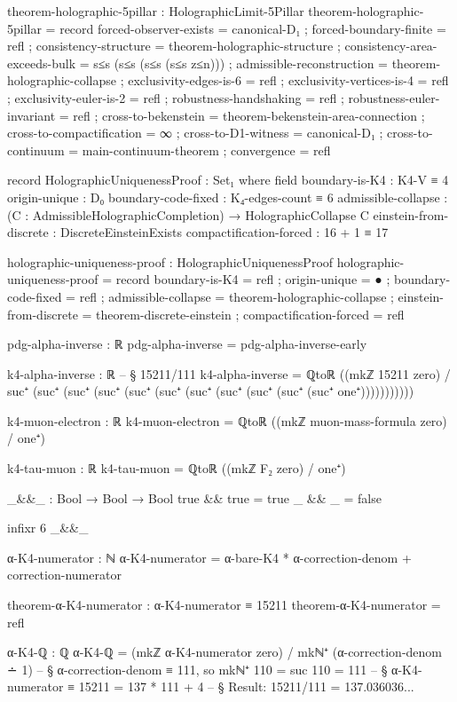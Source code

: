 \documentclass[11pt,a4paper]{book}
\begin{document}
\begin{code}
theorem-holographic-5pillar : HolographicLimit-5Pillar
theorem-holographic-5pillar = record
  { forced-observer-exists        = canonical-D₁
  ; forced-boundary-finite        = refl
  ; consistency-structure         = theorem-holographic-structure
  ; consistency-area-exceeds-bulk = s≤s (s≤s (s≤s (s≤s z≤n)))
  ; admissible-reconstruction     = theorem-holographic-collapse
  ; exclusivity-edges-is-6        = refl
  ; exclusivity-vertices-is-4     = refl
  ; exclusivity-euler-is-2        = refl
  ; robustness-handshaking        = refl
  ; robustness-euler-invariant    = refl
  ; cross-to-bekenstein           = theorem-bekenstein-area-connection
  ; cross-to-compactification     = ∞
  ; cross-to-D1-witness           = canonical-D₁
  ; cross-to-continuum            = main-continuum-theorem
  ; convergence                   = refl
  }

record HolographicUniquenessProof : Set₁ where
  field
    boundary-is-K4 : K4-V ≡ 4
    origin-unique : D₀
    boundary-code-fixed : K₄-edges-count ≡ 6
    admissible-collapse : (C : AdmissibleHolographicCompletion) → HolographicCollapse C
    einstein-from-discrete : DiscreteEinsteinExists
    compactification-forced : 16 + 1 ≡ 17

holographic-uniqueness-proof : HolographicUniquenessProof
holographic-uniqueness-proof = record
  { boundary-is-K4 = refl
  ; origin-unique = ●
  ; boundary-code-fixed = refl
  ; admissible-collapse = theorem-holographic-collapse
  ; einstein-from-discrete = theorem-discrete-einstein
  ; compactification-forced = refl
  }

pdg-alpha-inverse : ℝ
pdg-alpha-inverse = pdg-alpha-inverse-early

k4-alpha-inverse : ℝ
-- § 15211/111
k4-alpha-inverse = ℚtoℝ ((mkℤ 15211 zero) / suc⁺ (suc⁺ (suc⁺ (suc⁺ (suc⁺ (suc⁺ (suc⁺ (suc⁺ (suc⁺ (suc⁺ (suc⁺ one⁺)))))))))))

k4-muon-electron : ℝ
k4-muon-electron = ℚtoℝ ((mkℤ muon-mass-formula zero) / one⁺)

k4-tau-muon : ℝ
k4-tau-muon = ℚtoℝ ((mkℤ F₂ zero) / one⁺)

_&&_ : Bool → Bool → Bool
true && true = true
_ && _ = false

infixr 6 _&&_

α-K4-numerator : ℕ
α-K4-numerator = α-bare-K4 * α-correction-denom + correction-numerator

theorem-α-K4-numerator : α-K4-numerator ≡ 15211
theorem-α-K4-numerator = refl

α-K4-ℚ : ℚ
α-K4-ℚ = (mkℤ α-K4-numerator zero) / mkℕ⁺ (α-correction-denom ∸ 1)
  -- § α-correction-denom ≡ 111, so mkℕ⁺ 110 = suc 110 = 111
  -- § α-K4-numerator ≡ 15211 = 137 * 111 + 4
  -- § Result: 15211/111 = 137.036036...


\end{code}
\end{document}
